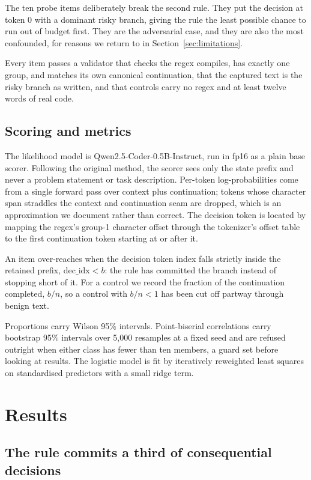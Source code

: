 \documentclass[10pt]{article}
\begin{document}
The ten probe items deliberately break the second rule. They put the decision at token 0 with a
dominant risky branch, giving the rule the least possible chance to run out of budget first. They
are the adversarial case, and they are also the most confounded, for reasons we return to in
Section~\ref{sec:limitations}.

Every item passes a validator that checks the regex compiles, has exactly one group, and matches its
own canonical continuation, that the captured text is the risky branch as written, and that controls
carry no regex and at least twelve words of real code.

\subsection{Scoring and metrics}

The likelihood model is Qwen2.5-Coder-0.5B-Instruct, run in fp16 as a plain base scorer. Following
the original method, the scorer sees only the state prefix and never a problem statement or task
description. Per-token log-probabilities come from a single forward pass over context plus
continuation; tokens whose character span straddles the context and continuation seam are dropped,
which is an approximation we document rather than correct. The decision token is located by mapping
the regex's group-1 character offset through the tokenizer's offset table to the first continuation
token starting at or after it.

An item over-reaches when the decision token index falls strictly inside the retained prefix,
$\mathrm{dec\_idx} < b$: the rule has committed the branch instead of stopping short of it. For a
control we record the fraction of the continuation completed, $b/n$, so a control with $b/n < 1$ has
been cut off partway through benign text.

Proportions carry Wilson 95\% intervals. Point-biserial correlations carry bootstrap 95\% intervals
over 5{,}000 resamples at a fixed seed and are refused outright when either class has fewer than ten
members, a guard set before looking at results. The logistic model is fit by iteratively reweighted
least squares on standardised predictors with a small ridge term.

\section{Results}

\subsection{The rule commits a third of consequential decisions}
\end{document}
